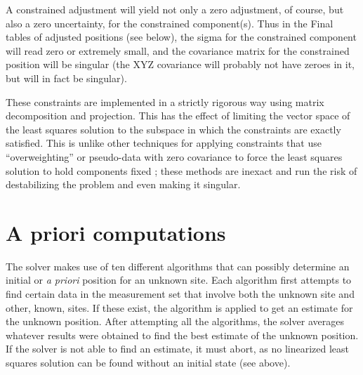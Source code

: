 A constrained adjustment will yield not only a zero adjustment, of course, but also a zero uncertainty, for the constrained component(s). Thus in the Final tables of adjusted positions (see below), the sigma for the constrained component will read zero or extremely small, and the covariance matrix for the constrained position will be singular (the XYZ covariance will probably not have zeroes in it, but will in fact be singular).

These constraints are implemented in a strictly rigorous way using matrix decomposition and projection. This has the effect of limiting the vector space of the least squares solution to the subspace in which the constraints are exactly satisfied. This is unlike other techniques for applying constraints that use ``overweighting'' or pseudo-data with zero covariance to force the least squares solution to hold components fixed \cite{ghilani}; these methods are inexact and run the risk of destabilizing the problem and even making it singular.


\section{A priori computations}
\label{sec:apriorisection}
The solver makes use of ten different algorithms that can possibly determine an initial or \emph{a priori} position for an unknown site. Each algorithm first attempts to find certain data in the measurement set that involve both the unknown site and other, known, sites. If these exist, the algorithm is applied to get an estimate for the unknown position. After attempting all the algorithms, the solver averages whatever results were obtained to find the best estimate of the unknown position. If the solver is not able to find an estimate, it must abort, as no linearized least squares solution can be found without an initial state (see above).

